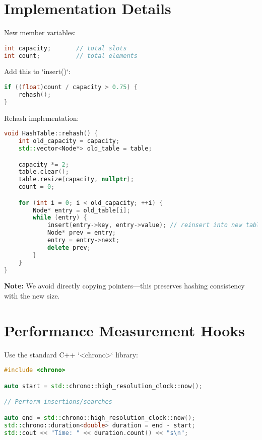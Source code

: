 \documentclass{article}
\begin{document}
\section*{Implementation Details}

New member variables:

\begin{lstlisting}[language=C++]
int capacity;       // total slots
int count;          // total elements
\end{lstlisting}

Add this to `insert()`:

\begin{lstlisting}[language=C++]
if ((float)count / capacity > 0.75) {
    rehash();
}
\end{lstlisting}

Rehash implementation:

\begin{lstlisting}[language=C++]
void HashTable::rehash() {
    int old_capacity = capacity;
    std::vector<Node*> old_table = table;

    capacity *= 2;
    table.clear();
    table.resize(capacity, nullptr);
    count = 0;

    for (int i = 0; i < old_capacity; ++i) {
        Node* entry = old_table[i];
        while (entry) {
            insert(entry->key, entry->value); // reinsert into new table
            Node* prev = entry;
            entry = entry->next;
            delete prev;
        }
    }
}
\end{lstlisting}

\textbf{Note:} We avoid directly copying pointers—this preserves hashing consistency with the new size.

\section*{Performance Measurement Hooks}

Use the standard C++ `<chrono>` library:

\begin{lstlisting}[language=C++]
#include <chrono>

auto start = std::chrono::high_resolution_clock::now();

// Perform insertions/searches

auto end = std::chrono::high_resolution_clock::now();
std::chrono::duration<double> duration = end - start;
std::cout << "Time: " << duration.count() << "s\n";
\end{lstlisting}
\end{document}
